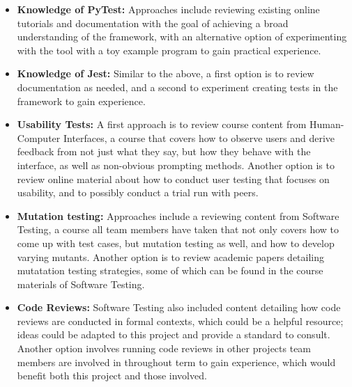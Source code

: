 \documentclass[12pt, titlepage]{article}
\begin{document}
\begin{enumerate}
  \begin{itemize}
    \item \textbf{Knowledge of PyTest:} Approaches include reviewing existing online tutorials and documentation with the goal of achieving a
    broad understanding of the framework, with an alternative option of experimenting with the tool with a toy example program to gain practical experience.
    \item \textbf{Knowledge of Jest:} Similar to the above, a first option is to review documentation as needed, and a second to experiment creating tests
    in the framework to gain experience.
    \item \textbf{Usability Tests:} A first approach is to review course content from Human-Computer Interfaces, a course that covers how to 
    observe users and derive feedback from not just what they say, but how they behave with the interface, as well as non-obvious prompting methods.
    Another option is to review online material about how to conduct user testing that focuses on usability, and to possibly conduct a trial run 
    with peers.
    \item \textbf{Mutation testing:} Approaches include a reviewing content from Software Testing, a course all team members have taken that not only 
    covers how to come up with test cases, but mutation testing as well, and how to develop varying mutants. Another option is to review 
    academic papers detailing mutatation testing strategies, some of which can be found in the course materials of Software Testing.
    \item \textbf{Code Reviews:} Software Testing also included content detailing how code reviews are conducted in formal contexts, which could be 
    a helpful resource; ideas could be adapted to this project and provide a standard to consult. Another option involves running code reviews in other 
    projects team members are involved in throughout term to gain experience, which would benefit both this project and those involved.
  \end{itemize}


\end{enumerate}
\end{document}
